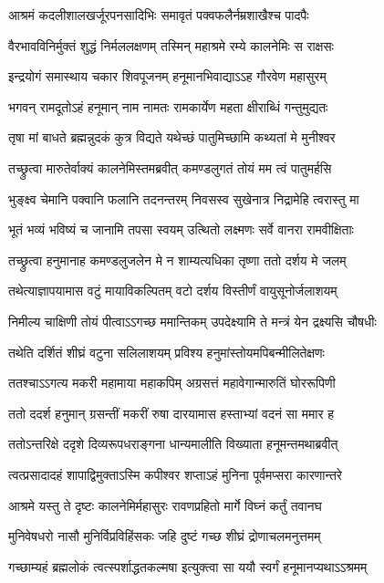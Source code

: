 \twolineshloka
{आश्रमं कदलीशालखर्जूरपनसादिभिः}
{समावृतं पक्वफलैर्नम्रशाखैश्च पादपैः} %

\twolineshloka
{वैरभावविनिर्मुक्तं शुद्धं निर्मललक्षणम्}
{तस्मिन् महाश्रमे रम्ये कालनेमिः स राक्षसः} %

\twolineshloka
{इन्द्रयोगं समास्थाय चकार शिवपूजनम्}
{हनूमानभिवाद्याऽऽह गौरवेण महासुरम्} %

\twolineshloka
{भगवन् रामदूतोऽहं हनूमान् नाम नामतः}
{रामकार्येण महता क्षीराब्धिं गन्तुमुद्यतः} %

\twolineshloka
{तृषा मां बाधते ब्रह्मन्नुदकं कुत्र विद्यते}
{यथेच्छं पातुमिच्छामि कथ्यतां मे मुनीश्वर} %

\twolineshloka
{तच्छ्रुत्वा मारुतेर्वाक्यं कालनेमिस्तमब्रवीत्}
{कमण्डलुगतं तोयं मम त्वं पातुमर्हसि} %

\twolineshloka
{भुङ्क्ष्व चेमानि पक्वानि फलानि तदनन्तरम्}
{निवसस्व सुखेनात्र निद्रामेहि त्वरास्तु मा} %

\twolineshloka
{भूतं भव्यं भविष्यं च जानामि तपसा स्वयम्}
{उत्थितो लक्ष्मणः सर्वे वानरा रामवीक्षिताः} %

\twolineshloka
{तच्छ्रुत्वा हनुमानाह कमण्डलुजलेन मे}
{न शाम्यत्यधिका तृष्णा ततो दर्शय मे जलम्} %

\twolineshloka
{तथेत्याज्ञापयामास वटुं मायाविकल्पितम्}
{वटो दर्शय विस्तीर्णं वायुसूनोर्जलाशयम्} %

\twolineshloka
{निमील्य चाक्षिणी तोयं पीत्वाऽऽगच्छ ममान्तिकम्}
{उपदेक्ष्यामि ते मन्त्रं येन द्रक्ष्यसि चौषधीः} %

\twolineshloka
{तथेति दर्शितं शीघ्रं वटुना सलिलाशयम्}
{प्रविश्य हनुमांस्तोयमपिबन्मीलितेक्षणः} %

\twolineshloka
{ततश्चाऽऽगत्य मकरी महामाया महाकपिम्}
{अग्रसत्तं महावेगान्मारुतिं घोररूपिणी} %

\twolineshloka
{ततो ददर्श हनुमान् ग्रसन्तीं मकरीं रुषा}
{दारयामास हस्ताभ्यां वदनं सा ममार ह} %

\twolineshloka
{ततोऽन्तरिक्षे ददृशे दिव्यरूपधराङ्गना}
{धान्यमालीति विख्याता हनूमन्तमथाब्रवीत्} %

\twolineshloka
{त्वत्प्रसादादहं शापाद्विमुक्ताऽस्मि कपीश्वर}
{शप्ताऽहं मुनिना पूर्वमप्सरा कारणान्तरे} %

\twolineshloka
{आश्रमे यस्तु ते दृष्टः कालनेमिर्महासुरः}
{रावणप्रहितो मार्गे विघ्नं कर्तुं तवानघ} %

\twolineshloka
{मुनिवेषधरो नासौ मुनिर्विप्रविहिंसकः}
{जहि दुष्टं गच्छ शीघ्रं द्रोणाचलमनुत्तमम्} %

\twolineshloka
{गच्छाम्यहं ब्रह्मलोकं त्वत्स्पर्शाद्धतकल्मषा}
{इत्युक्त्वा सा ययौ स्वर्गं हनूमानप्यथाऽऽश्रमम्} %

